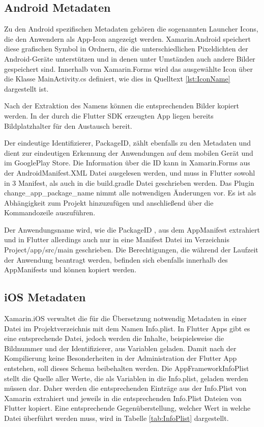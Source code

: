 \subsection{Android Metadaten}
Zu den Android spezifischen Metadaten gehören die sogenannten Launcher Icons, die den Anwendern als App-Icon angezeigt werden. Xamarin.Android speichert diese grafischen Symbol in Ordnern, die die unterschiedlichen Pixeldichten der Android-Geräte unterstützen und in denen unter Umständen auch andere Bilder gespeichert sind.  Innerhalb von Xamarin.Forms wird das ausgewählte Icon über die Klasse MainActivity.cs definiert, wie dies in Quelltext \ref{lst:IconName} dargestellt ist. 



Nach der Extraktion des Namens können die entsprechenden Bilder kopiert werden.  In der durch die Flutter SDK erzeugten App liegen bereits Bildplatzhalter für den Austausch bereit.

Der eindeutige Identifizierer,  PackageID,  zählt ebenfalls zu den Metadaten und dient zur eindeutigen Erkennung der Anwendungen auf dem mobilen Gerät und im GooglePlay Store.  Die Information über die ID kann in Xamarin.Forms aus der AndroidManifest.XML Datei ausgelesen werden, und muss in Flutter sowohl in 3 Manifest,  als auch in die build.gradle Datei geschrieben werden.  Das Plugin \glq change\_app\_package\_name\grq{}  nimmt alle notwendigen Änderungen vor.  Es ist als Abhängigkeit zum Projekt hinzuzufügen und anschließend über die Kommandozeile auszuführen. 

Der Anwendungsname wird, wie die PackageID , aus dem AppManifest extrahiert und in Flutter allerdings auch nur in eine Manifest Datei im Verzeichnis Project/app/src/main\grq{} geschrieben.  Die Berechtigungen,  die während der Laufzeit der Anwendung beantragt werden,  befinden sich ebenfalls innerhalb des AppManifests und können kopiert werden.

\subsection{iOS Metadaten}
Xamarin.iOS verwaltet die für die Übersetzung notwendig Metadaten in einer Datei im  Projektverzeichnis mit dem Namen Info.plist.  In Flutter Apps gibt es eine entsprechende Datei,  jedoch werden die Inhalte,  beispielsweise die Bildnummer und der Identifizierer,  aus Variablen geladen.  Damit nach der Kompilierung keine Besonderheiten in der Administration der Flutter App entstehen,  soll dieses Schema beibehalten werden.  Die AppFrameworkInfoPlist stellt die Quelle aller Werte,  die als Variablen in die Info.plist, geladen werden müssen dar.   Daher werden die entsprechenden Einträge aus der Info.Plist von Xamarin extrahiert und jeweils in die entsprechenden Info.Plist Dateien von Flutter kopiert.  Eine entsprechende Gegenüberstellung, welcher Wert in welche Datei überführt werden muss,  wird in Tabelle \ref{tab:InfoPlist} dargestellt. 


